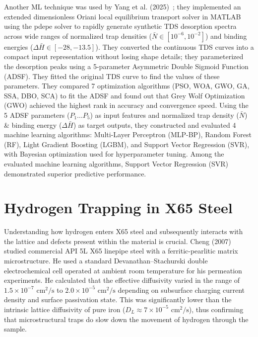 \documentclass[a4paper,12pt,oneside]{report}
\begin{document}
Another ML technique was used by Yang et al. (2025)~\cite{Yang2025}; they implemented an extended dimensionless Oriani local equilibrium transport solver in MATLAB using the pdepe solver to rapidly generate synthetic TDS desorption spectra across wide ranges of normalized trap densities ($\bar{N} \in [10^{-6}, 10^{-2}]$) and binding energies ($\Delta \bar{H} \in [-28, -13.5]$). They converted the continuous TDS curves into a compact input representation without losing shape details; they parameterized the desorption peaks using a 5-parameter Asymmetric Double Sigmoid Function (ADSF). They fitted the original TDS curve to find the values of these parameters. They compared 7 optimization algorithms (PSO, WOA, GWO, GA, SSA, DBO, SCA) to fit the ADSF and found out that Grey Wolf Optimization (GWO) achieved the highest rank in accuracy and convergence speed. Using the 5 ADSF parameters ($P_1 \dots P_5$) as input features and normalized trap density ($\bar{N}$) \& binding energy ($\Delta \bar{H}$) as target outputs, they constructed and evaluated 4 machine learning algorithms: Multi-Layer Perceptron (MLP-BP), Random Forest (RF), Light Gradient Boosting (LGBM), and Support Vector Regression (SVR), with Bayesian optimization used for hyperparameter tuning. Among the evaluated machine learning algorithms, Support Vector Regression (SVR) demonstrated superior predictive performance.

\section{Hydrogen Trapping in X65 Steel}
\label{sec:hydrogen_trapping_x65}

Understanding how hydrogen enters X65 steel and subsequently interacts with the lattice and defects present within the material is crucial. Cheng (2007) studied commercial API 5L X65 linepipe steel with a ferritic-pearlitic matrix microstructure. He used a standard Devanathan--Stachurski double electrochemical cell operated at ambient room temperature for his permeation experiments. He calculated that the effective diffusivity varied in the range of $1.5 \times 10^{-7}\text{ cm}^2/\text{s}$ to $2.0 \times 10^{-5}\text{ cm}^2/\text{s}$ depending on subsurface charging current density and surface passivation state. This was significantly lower than the intrinsic lattice diffusivity of pure iron ($D_L \approx 7 \times 10^{-5}\text{ cm}^2/\text{s}$), thus confirming that microstructural traps do slow down the movement of hydrogen through the sample.
\end{document}
